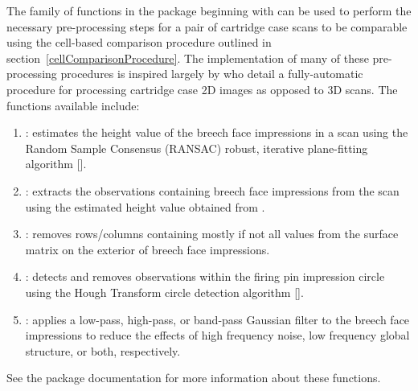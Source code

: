 The family of functions in the  package beginning with  can be used to perform the necessary pre-processing steps for a pair of cartridge case scans to be comparable using the cell-based comparison procedure outlined in section~\ref{cellComparisonProcedure}. The implementation of many of these pre-processing procedures is inspired largely by \citet{tai_fully_2018} who detail a fully-automatic procedure for processing cartridge case 2D images as opposed to 3D scans. The functions available include:
\begin{enumerate}
\item {}: estimates the height value of the breech face impressions in a scan using the Random Sample Consensus (RANSAC) robust, iterative plane-fitting algorithm [\citet{ransac}].

\item {}: extracts the observations containing breech face impressions from the scan using the estimated height value obtained from .

\item {}: removes rows/columns containing mostly if not all  values from the surface matrix on the exterior of breech face impressions.

\item {}: detects and removes observations within the firing pin impression circle using the Hough Transform circle detection algorithm [\citet{hough}].

\item {}: applies a low-pass, high-pass, or band-pass Gaussian filter to the breech face impressions to reduce the effects of high frequency noise, low frequency global structure, or both, respectively.
\end{enumerate}
See the  package documentation for more information about these functions.


